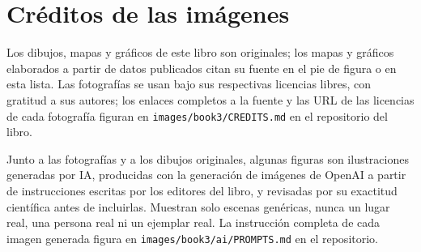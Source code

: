 \chapter*{Créditos de las imágenes}

Los dibujos, mapas y gráficos de este libro son originales; los mapas y gráficos
elaborados a partir de datos publicados citan su fuente en el pie de figura o en
esta lista. Las fotografías se usan bajo sus respectivas licencias libres, con
gratitud a sus autores; los enlaces completos a la fuente y las URL de las
licencias de cada fotografía figuran en \texttt{images/book3/CREDITS.md} en el
repositorio del libro.

\bigskip
Junto a las fotografías y a los dibujos originales, algunas figuras son
ilustraciones generadas por IA, producidas con la generación de imágenes de OpenAI
a partir de instrucciones escritas por los editores del libro, y revisadas por su
exactitud científica antes de incluirlas. Muestran solo escenas genéricas, nunca un
lugar real, una persona real ni un ejemplar real. La instrucción completa de cada
imagen generada figura en \texttt{images/book3/ai/PROMPTS.md} en el repositorio.

